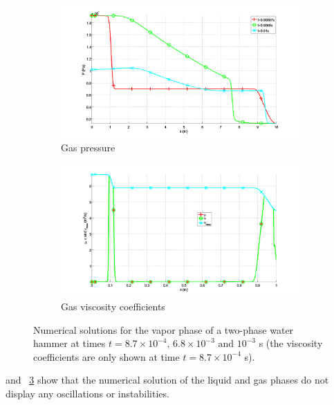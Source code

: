 \documentclass{mc2015}
\begin{document}
\begin{figure}[H]
        \begin{subfigure}[b]{0.495\textwidth}
                \centering
                \includegraphics[width=\textwidth]{figures/Plot_pressure_gas_phase.png}
                \caption{Gas pressure}
                \label{fig:vap-phase-press}
        \end{subfigure}        
        \begin{subfigure}[b]{0.495\textwidth}
                \centering
                \includegraphics[width=\textwidth]{figures/Plot_viscosity_gas_phase.png}
                \caption{Gas viscosity coefficients}
                \label{fig:vap-phase-visc}
        \end{subfigure}
        \caption{Numerical solutions for the vapor phase of a two-phase water hammer at times $t=8.7 \times 10^{-4}, \, 6.8 \times 10^{-3} \text{ and } 10^{-3}$ s (the viscosity coefficients are only shown at time $t=8.7 \times 10^{-4}$ s).}\label{fig:vapor-phase}
\end{figure}
%
 and ~\ref{fig:vapor-phase} show that the numerical solution of the liquid and gas phases do not display any oscillations or instabilities. 
\end{document}
